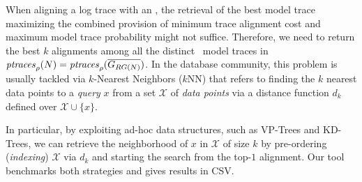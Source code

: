 When aligning a log trace with an \uswn, the retrieval of the best model trace maximizing the combined provision of minimum trace alignment cost and maximum model trace probability might not suffice. 
Therefore, we need to return the best $k$ alignments among all the distinct \unravelled\ model traces in $\mathit{ptraces}_{\rho}(N)=\mathit{ptraces}_{\rho}(\overline{G_{RG(N)}})$. In the database community, this problem is usually tackled via $k$-Nearest Neighbors ($k$NN) that refers to finding the $k$ nearest data points to a \textit{query} $x$ from a set $\mathcal{X}$ of \textit{data points} via a distance function $d_k$ defined over $\mathcal{X}\cup\{x\}$. {In particular, by exploiting ad-hoc data structures, such as VP-Trees and KD-Trees, %
we can retrieve the neighborhood of $x$ in $\mathcal{X}$ of size $k$ by pre-ordering (\textit{indexing}) $\mathcal{X}$ via $d_k$ and starting the search from the top-$1$ alignment. Our tool benchmarks both strategies and gives results in CSV.


}

